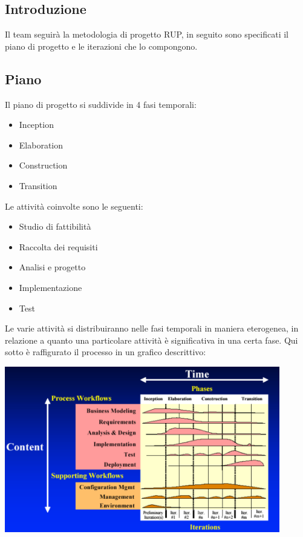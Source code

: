 \setlength{\arrayrulewidth}{.5mm}
\setlength{\tabcolsep}{5pt}
\renewcommand{\arraystretch}{2}

\subsection{Introduzione}
Il team seguirà la metodologia di progetto RUP, in seguito sono specificati il piano di progetto e le
iterazioni che lo compongono.

\subsection{Piano}
Il piano di progetto si suddivide in 4 fasi temporali:
\begin{itemize}
    \item Inception
    \item Elaboration
    \item Construction
    \item Transition
\end{itemize}
Le attività coinvolte sono le seguenti:
\begin{itemize}
    \item Studio di fattibilità
    \item Raccolta dei requisiti
    \item Analisi e progetto
    \item Implementazione
    \item Test
\end{itemize}
Le varie attività si distribuiranno nelle fasi temporali in maniera eterogenea, in relazione a quanto una particolare attività è significativa in una certa fase. Qui sotto è raffigurato il processo in un grafico descrittivo: \vspace{0.6cm}

\includegraphics[width=12cm]{images/RUPplan.png}

